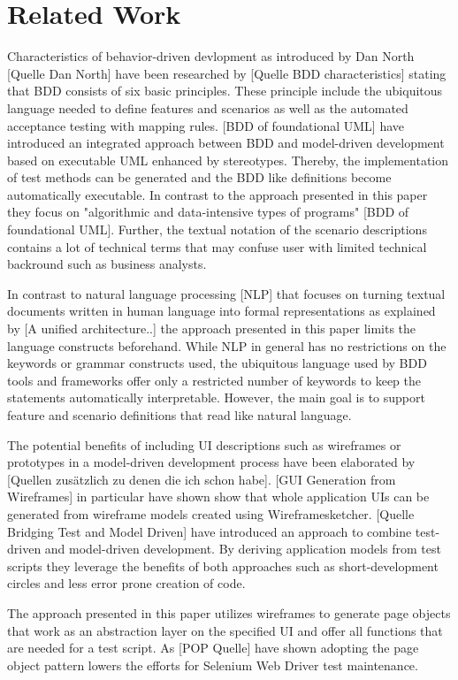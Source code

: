 \documentclass{sig-alternate-05-2015}
\begin{document}
\section{Related Work}\label{sec:RelatedWork}
Characteristics of behavior-driven devlopment as introduced by Dan North [Quelle Dan North] have been researched by [Quelle BDD characteristics] stating that BDD consists of six basic principles.
These principle include the ubiquitous language needed to define features and scenarios as well as the automated acceptance testing with mapping rules.
[BDD of foundational UML] have introduced an integrated approach between BDD and model-driven development based on executable UML enhanced by stereotypes.
Thereby, the implementation of test methods can be generated and the BDD like definitions become automatically executable.
In contrast to the approach presented in this paper they focus on "algorithmic and data-intensive types of programs" [BDD of foundational UML].
Further, the textual notation of the scenario descriptions contains a lot of technical terms that may confuse user with limited technical backround such as business analysts.

In contrast to natural language processing [NLP] that focuses on turning textual documents written in human language into formal representations as explained by [A unified architecture..] the approach presented in this paper limits the language constructs beforehand.
While NLP in general has no restrictions on the keywords or grammar constructs used, the ubiquitous language used by BDD tools and frameworks offer only a restricted number of keywords to keep the statements automatically interpretable.
However, the main goal is to support feature and scenario definitions that read like natural language.


The potential benefits of including UI descriptions such as wireframes or prototypes in a model-driven development process have been elaborated by [Quellen zusätzlich zu denen die ich schon habe].
[GUI Generation from Wireframes] in particular have shown show that whole application UIs can be generated from wireframe models created using Wireframesketcher.
[Quelle Bridging Test and Model Driven] have introduced an approach to combine test-driven and model-driven development.
By deriving application models from test scripts they leverage the benefits of both approaches such as short-development circles and less error prone creation of code.

The approach presented in this paper utilizes wireframes to generate page objects that work as an abstraction layer on the specified UI and offer all functions that are needed for a test script.
As [POP Quelle] have shown adopting the page object pattern lowers the efforts for Selenium Web Driver test maintenance.
\end{document}
